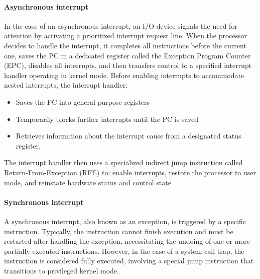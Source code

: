 \paragraph*{Asynchronous interrupt}
In the case of an asynchronous interrupt, an I/O device signals the need for attention by activating a prioritized interrupt request line.
When the processor decides to handle the interrupt, it completes all instructions before the current one, saves the PC in a dedicated register called the Exception Program Counter (EPC), disables all interrupts, and then transfers control to a specified interrupt handler operating in kernel mode.
Before enabling interrupts to accommodate nested interrupts, the interrupt handler:
\begin{itemize}
    \item Saves the PC into general-purpose registers
    \item Temporarily blocks further interrupts until the PC is saved
    \item Retrieves information about the interrupt cause from a designated status register.
\end{itemize}
The interrupt handler then uses a specialized indirect jump instruction called Return-From-Exception (RFE) to: enable interrupts, restore the processor to user mode, and reinstate hardware status and control state

\paragraph*{Synchronous interrupt}
A synchronous interrupt, also known as an exception, is triggered by a specific instruction. 
Typically, the instruction cannot finish execution and must be restarted after handling the exception, necessitating the undoing of one or more partially executed instructions. 
However, in the case of a system call trap, the instruction is considered fully executed, involving a special jump instruction that transitions to privileged kernel mode.

